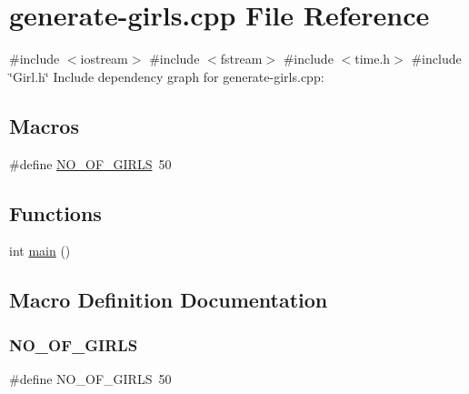 \hypertarget{generate-girls_8cpp}{}\section{generate-\/girls.cpp File Reference}
\label{generate-girls_8cpp}
{\ttfamily \#include $<$iostream$>$}\newline
{\ttfamily \#include $<$fstream$>$}\newline
{\ttfamily \#include $<$time.\+h$>$}\newline
{\ttfamily \#include \char`\"{}Girl.\+h\char`\"{}}\newline
Include dependency graph for generate-\/girls.cpp\+:
\subsection*{Macros}
\begin{DoxyCompactItemize}
\item 
\#define \hyperlink{generate-girls_8cpp_ada74c90de4a46e1d4d4afb1a34d3054c}{N\+O\+\_\+\+O\+F\+\_\+\+G\+I\+R\+LS}~50
\end{DoxyCompactItemize}
\subsection*{Functions}
\begin{DoxyCompactItemize}
\item 
int \hyperlink{generate-girls_8cpp_ae66f6b31b5ad750f1fe042a706a4e3d4}{main} ()
\end{DoxyCompactItemize}


\subsection{Macro Definition Documentation}
\mbox{\label{generate-girls_8cpp_ada74c90de4a46e1d4d4afb1a34d3054c}} 
\subsubsection{\texorpdfstring{N\+O\+\_\+\+O\+F\+\_\+\+G\+I\+R\+LS}{NO\_OF\_GIRLS}}
{\footnotesize\ttfamily \#define N\+O\+\_\+\+O\+F\+\_\+\+G\+I\+R\+LS~50}



